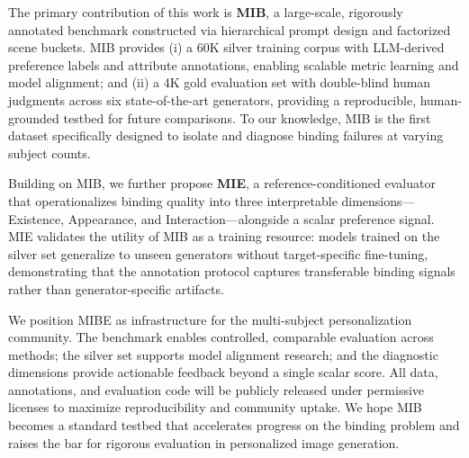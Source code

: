 \documentclass{article}
\begin{document}
The primary contribution of this work is \textbf{MIB}, a large-scale, rigorously annotated benchmark constructed via hierarchical prompt design and factorized scene buckets.  
MIB provides (i) a 60K silver training corpus with LLM-derived preference labels and attribute annotations, enabling scalable metric learning and model alignment; and (ii) a 4K gold evaluation set with double-blind human judgments across six state-of-the-art generators, providing a reproducible, human-grounded testbed for future comparisons.  
To our knowledge, MIB is the first dataset specifically designed to isolate and diagnose binding failures at varying subject counts.

Building on MIB, we further propose \textbf{MIE}, a reference-conditioned evaluator that operationalizes binding quality into three interpretable dimensions—Existence, Appearance, and Interaction—alongside a scalar preference signal.  
MIE validates the utility of MIB as a training resource: models trained on the silver set generalize to unseen generators without target-specific fine-tuning, demonstrating that the annotation protocol captures transferable binding signals rather than generator-specific artifacts.

We position MIBE as infrastructure for the multi-subject personalization community.  
The benchmark enables controlled, comparable evaluation across methods; the silver set supports model alignment research; and the diagnostic dimensions provide actionable feedback beyond a single scalar score.  
All data, annotations, and evaluation code will be publicly released under permissive licenses to maximize reproducibility and community uptake.
We hope MIB becomes a standard testbed that accelerates progress on the binding problem and raises the bar for rigorous evaluation in personalized image generation.


  



\newpage
\appendix
\end{document}
